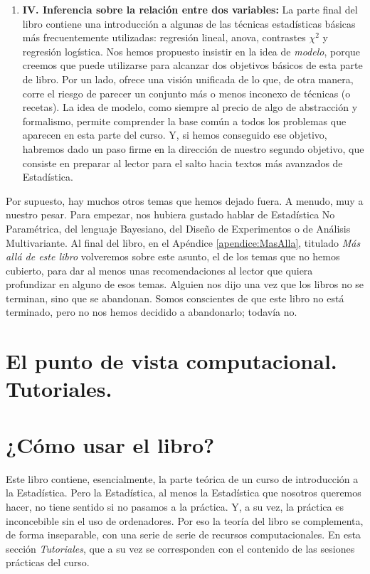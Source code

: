 \begin{enumerate}
  \item[]{\bf IV. Inferencia sobre la relación entre dos variables:} La parte final del libro contiene una introducción a algunas de las técnicas estadísticas básicas más frecuentemente utilizadas: regresión lineal, anova, contrastes $\chi^2$ y regresión logística. Nos hemos propuesto insistir en la idea de {\em modelo}, porque creemos que puede utilizarse para alcanzar dos objetivos básicos de esta parte de libro. Por un lado, ofrece una visión unificada de lo que, de otra manera, corre el riesgo de parecer un conjunto más o menos inconexo de técnicas (o recetas). La idea de modelo, como siempre al precio de algo de abstracción y formalismo, permite comprender la base común a todos los problemas que aparecen en esta parte del curso. Y, si hemos conseguido ese objetivo, habremos dado un paso firme en la dirección de nuestro segundo objetivo, que consiste en preparar al lector para el salto hacia textos más avanzados de Estadística.

\end{enumerate}

Por supuesto, hay muchos otros temas que hemos dejado fuera. A menudo, muy a nuestro pesar. Para empezar, nos hubiera gustado hablar de Estadística No Paramétrica, del lenguaje Bayesiano, del Diseño de Experimentos o de Análisis Multivariante. Al final del libro, en el Apéndice \ref{apendice:MasAlla}, titulado {\em Más allá de este libro} volveremos sobre este asunto, el de los temas que no hemos cubierto, para dar al menos unas recomendaciones al lector que quiera profundizar en alguno de esos temas. Alguien nos dijo una vez que los libros no se terminan, sino que se abandonan. Somos conscientes de que este libro no está terminado, pero no nos hemos decidido a abandonarlo; todavía no.


\section*{El punto de vista computacional. Tutoriales.}




\section*{¿Cómo usar el libro?}
\label{prefacio:sec:ComoUsar}

Este libro contiene, esencialmente, la parte teórica de un curso de introducción a la Estadística. Pero la Estadística, al menos la Estadística que nosotros queremos hacer, no tiene sentido si no pasamos a la práctica. Y, a su vez, la práctica es inconcebible sin el uso de ordenadores. Por eso la teoría del libro se complementa, de forma inseparable, con una serie de serie de recursos computacionales. En esta sección
{\em Tutoriales}, que a su vez se corresponden con el contenido de las  sesiones prácticas del curso.

